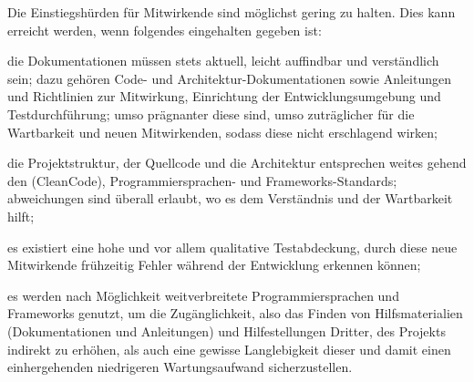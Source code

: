 Die Einstiegshürden für Mitwirkende sind möglichst gering zu halten.
Dies kann erreicht werden, wenn \uA folgendes eingehalten \bzw gegeben ist:
\begin{inparaenum}[\bfseries(a)]
    \item die Dokumentationen müssen stets aktuell, leicht auffindbar und verständlich sein;
    dazu gehören \uA Code- und Architektur-Dokumentationen sowie Anleitungen und Richtlinien zur Mitwirkung, Einrichtung der Entwicklungsumgebung und Testdurchführung;
    umso prägnanter diese sind, umso zuträglicher für die Wartbarkeit und \insb neuen Mitwirkenden, sodass diese nicht erschlagend wirken;
    \item die Projektstruktur, der Quellcode und die Architektur entsprechen weites gehend den  (\zB CleanCode), Programmiersprachen- und Frameworks-Standards;
    abweichungen sind überall erlaubt, wo es \insb dem Verständnis und der Wartbarkeit hilft;
    \item es existiert eine hohe und vor allem qualitative Testabdeckung, durch diese \insb neue Mitwirkende frühzeitig Fehler während der Entwicklung erkennen können;
    \item es werden nach Möglichkeit weitverbreitete Programmiersprachen und Frameworks genutzt, um die Zugänglichkeit, also das Finden von Hilfsmaterialien (\zB Dokumentationen und Anleitungen) und Hilfestellungen Dritter, des Projekts indirekt zu erhöhen, als auch eine gewisse Langlebigkeit dieser und damit einen einhergehenden niedrigeren Wartungsaufwand sicherzustellen.
\end{inparaenum}
